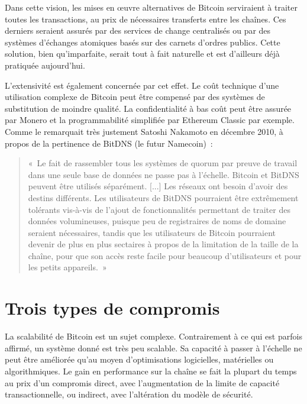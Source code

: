 Dans cette vision, les mises en œuvre alternatives de Bitcoin serviraient à traiter toutes les transactions, au prix de nécessaires transferts entre les chaînes. Ces derniers seraient assurés par des services de change centralisés ou par des systèmes d'échanges atomiques basés sur des carnets d'ordres publics. Cette solution, bien qu'imparfaite, serait tout à fait naturelle et est d'ailleurs déjà pratiquée aujourd'hui.

L'extensivité est également concernée par cet effet. Le coût technique d'une utilisation complexe de Bitcoin peut être compensé par des systèmes de substitution de moindre qualité. La confidentialité à bas coût peut être assurée par Monero et la programmabilité simplifiée par Ethereum Classic par exemple. Comme le remarquait très justement Satoshi Nakamoto en décembre 2010, à propos de la pertinence de BitDNS (le futur Namecoin)~:

\begin{quote}
«~Le fait de rassembler tous les systèmes de quorum par preuve de travail dans une seule base de données ne passe pas à l'échelle. Bitcoin et BitDNS peuvent être utilisés séparément. [...] Les réseaux ont besoin d'avoir des destins différents. Les utilisateurs de BitDNS pourraient être extrêmement tolérants vis-à-vis de l'ajout de fonctionnalités permettant de traiter des données volumineuses, puisque peu de registraires de noms de domaine seraient nécessaires, tandis que les utilisateurs de Bitcoin pourraient devenir de plus en plus sectaires à propos de la limitation de la taille de la chaîne, pour que son accès reste facile pour beaucoup d'utilisateurs et pour les petits appareils.~»
\end{quote}

\section*{Trois types de compromis}

La scalabilité de Bitcoin est un sujet complexe. Contrairement à ce qui est parfois affirmé, un système donné est très peu scalable. Sa capacité à passer à l'échelle ne peut être améliorée qu'au moyen d'optimisations logicielles, matérielles ou algorithmiques. Le gain en performance sur la chaîne se fait la plupart du temps au prix d'un compromis direct, avec l'augmentation de la limite de capacité transactionnelle, ou indirect, avec l'altération du modèle de sécurité.

